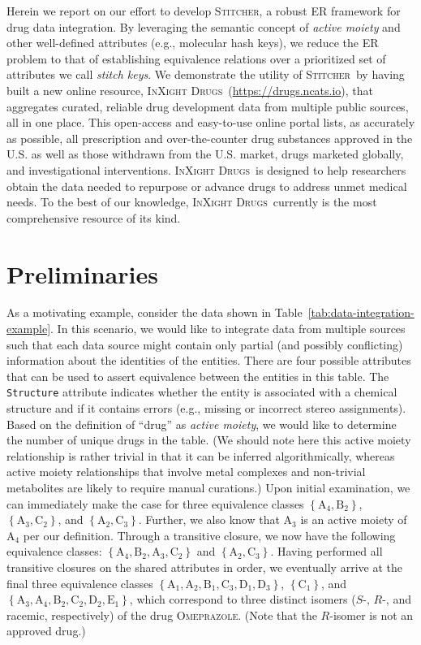 \documentclass{bmcart}
\newcommand\st{\textsc{Stitcher}}
\newcommand\ix{\textsc{InXight Drugs}}
\begin{document}
Herein we report on our effort to develop \st, a robust ER framework
for drug data integration. By leveraging the semantic concept of
\emph{active moiety} and other well-defined attributes (e.g.,
molecular hash keys), we reduce the ER problem to that of establishing
equivalence relations over a prioritized set of attributes we call
\emph{stitch keys}. We demonstrate the utility of \st\ by having built 
a new online resource, \ix\ (\url{https://drugs.ncats.io}), that
aggregates curated, reliable drug development data from multiple
public sources, all in one place. This open-access and easy-to-use
online portal lists, as accurately as possible, all prescription and
over-the-counter drug substances approved in the U.S. as well as those
withdrawn from the U.S. market, drugs marketed globally, and
investigational interventions. \ix\ is designed to help researchers
obtain the data needed to repurpose or advance drugs to address unmet
medical needs. To the best of our knowledge, \ix\ currently is the
most comprehensive resource of its kind.

\section*{Preliminaries}
As a motivating example, consider the data shown in
Table~\ref{tab:data-integration-example}. In this scenario, we would like 
to integrate data from multiple sources such that each data source 
might contain only partial (and possibly conflicting) information
about the identities of the entities. There are four possible
attributes that can be used to assert equivalence between the entities
in this table. The \verb|Structure| attribute indicates whether the
entity is associated with a chemical structure and if it contains
errors (e.g., missing or incorrect stereo assignments). Based on the
definition of ``drug'' as \emph{active moiety}, we would like to
determine the number of unique drugs in the table. (We should note here
this active moiety relationship is rather trivial in that it can
be inferred algorithmically, whereas active moiety relationships that
involve metal complexes and non-trivial metabolites are likely to
require manual curations.) Upon initial examination, we can
immediately make the case for three equivalence classes
$\left\{\textrm{A}_4, \textrm{B}_2\right\}$, $\left\{\textrm{A}_3,
\textrm{C}_2\right\}$, and $\left\{\textrm{A}_2,
\textrm{C}_3\right\}$. Further, we also know that $\textrm{A}_3$ is an
active moiety of $\textrm{A}_4$ per our definition. Through a
transitive closure, we now have the following equivalence classes:
$\left\{\textrm{A}_4, \textrm{B}_2, \textrm{A}_3,
\textrm{C}_2\right\}$ and $\left\{\textrm{A}_2,
\textrm{C}_3\right\}$. Having performed all transitive closures on 
the shared attributes in order, we eventually arrive at the final three
equivalence classes $\left\{\textrm{A}_1, \textrm{A}_2, \textrm{B}_1,
\textrm{C}_3, \textrm{D}_1, \textrm{D}_3\right\}$,
$\left\{\textrm{C}_1\right\}$, and $\left\{\textrm{A}_3, \textrm{A}_4,
\textrm{B}_2, \textrm{C}_2, \textrm{D}_2, \textrm{E}_1\right\}$, which
correspond to three distinct isomers ($S$-, $R$-, and racemic,
respectively) of the drug \textsc{Omeprazole}. (Note that the
$R$-isomer is not an approved drug.)
\end{document}
